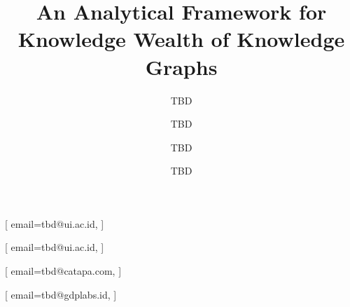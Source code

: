 \documentclass[
]{ceurart}
\begin{document}


\title{An Analytical Framework for Knowledge Wealth of Knowledge Graphs}


\author[1]{TBD}[%
email=tbd@ui.ac.id,
]
\author[1]{TBD}[%
email=tbd@ui.ac.id,
]
\address[1]{Faculty of Computer Science, Universitas Indonesia, Depok, Indonesia}

\author[2]{TBD}[%
email=tbd@catapa.com,
]
\address[2]{CATAPA, Jakarta, Indonesia}

\author[3]{TBD}[%
email=tbd@gdplabs.id,
]
\address[3]{GDP Labs, Jakarta, Indonesia}

\end{document}
